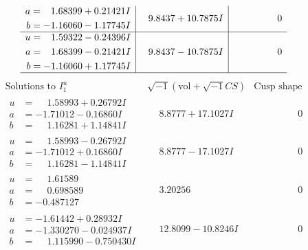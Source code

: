 \documentclass[1p]{elsarticle_modified}
\theoremstyle{definition}
\newcommand{\I}{\sqrt{-1}}
\begin{document}
$$\begin{array}{c|c|c}
\begin{aligned}
a &= \phantom{-}1.68399 + 0.21421 I \\
b &= -1.16060 - 1.17745 I\end{aligned}
 & \phantom{-}9.8437 + 10.7875 I & \phantom{-0.000000 } 0 \\ \hline\begin{aligned}
u &= \phantom{-}1.59322 - 0.24396 I \\
a &= \phantom{-}1.68399 - 0.21421 I \\
b &= -1.16060 + 1.17745 I\end{aligned}
 & \phantom{-}9.8437 - 10.7875 I & \phantom{-0.000000 } 0\\
 \hline 
 \end{array}$$\newpage$$\begin{array}{c|c|c}  
\text{Solutions to }I^u_{1}& \I (\text{vol} + \sqrt{-1}CS) & \text{Cusp shape}\\
 \hline 
\begin{aligned}
u &= \phantom{-}1.58993 + 0.26792 I \\
a &= -1.71012 - 0.16860 I \\
b &= \phantom{-}1.16281 + 1.14841 I\end{aligned}
 & \phantom{-}8.8777 + 17.1027 I & \phantom{-0.000000 } 0 \\ \hline\begin{aligned}
u &= \phantom{-}1.58993 - 0.26792 I \\
a &= -1.71012 + 0.16860 I \\
b &= \phantom{-}1.16281 - 1.14841 I\end{aligned}
 & \phantom{-}8.8777 - 17.1027 I & \phantom{-0.000000 } 0 \\ \hline\begin{aligned}
u &= \phantom{-}1.61589\phantom{ +0.000000I} \\
a &= \phantom{-}0.698589\phantom{ +0.000000I} \\
b &= -0.487127\phantom{ +0.000000I}\end{aligned}
 & \phantom{-}3.20256\phantom{ +0.000000I} & \phantom{-0.000000 } 0 \\ \hline\begin{aligned}
u &= -1.61442 + 0.28932 I \\
a &= -1.330270 - 0.024937 I \\
b &= \phantom{-}1.115990 - 0.750430 I\end{aligned}
 & \phantom{-}12.8099 - 10.8246 I & \phantom{-0.000000 } 0 \\ \hline\begin{aligned}

\end{aligned}
\end{array}$$
\end{document}
